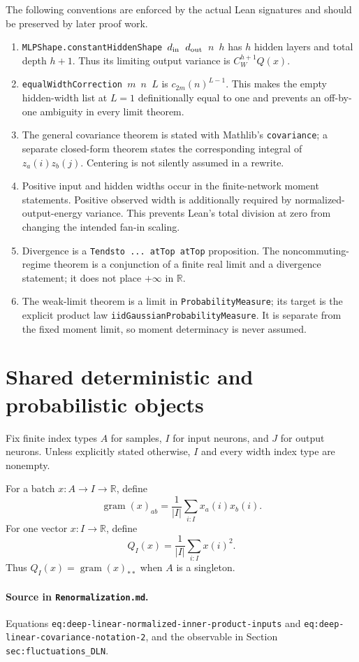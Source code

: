 The following conventions are enforced by the actual Lean signatures and should be preserved by
later proof work.
\begin{enumerate}
  \item \texttt{MLPShape.constantHiddenShape $d_{\rm in}$ $d_{\rm out}$ $n$ $h$} has $h$
    hidden layers and total depth $h+1$.  Thus its limiting output variance is
    $C_W^{h+1}Q(x)$.
  \item \texttt{equalWidthCorrection $m$ $n$ $L$} is
    $c_{2m}(n)^{L-1}$.  This makes the empty hidden-width list at $L=1$ definitionally equal to
    one and prevents an off-by-one ambiguity in every limit theorem.
  \item The general covariance theorem is stated with Mathlib's \texttt{covariance}; a separate
    closed-form theorem states the corresponding integral of $z_a(i)z_b(j)$.  Centering is not
    silently assumed in a rewrite.
  \item Positive input and hidden widths occur in the finite-network moment statements.  Positive
    observed width is additionally required by normalized-output-energy variance.  This prevents
    Lean's total division at zero from changing the intended fan-in scaling.
  \item Divergence is a \texttt{Tendsto ... atTop atTop} proposition.  The noncommuting-regime
    theorem is a conjunction of a finite real limit and a divergence statement; it does not place
    $+\infty$ in $\mathbb R$.
  \item The weak-limit theorem is a limit in \texttt{ProbabilityMeasure}; its target is the
    explicit product law \texttt{iidGaussianProbabilityMeasure}.  It is separate from the fixed
    moment limit, so moment determinacy is never assumed.
\end{enumerate}

\section{Shared deterministic and probabilistic objects}

Fix finite index types $A$ for samples, $I$ for input neurons, and $J$ for output neurons.  Unless
explicitly stated otherwise, $I$ and every width index type are nonempty.

\begin{definition}
\label{def:dln:normalizedGram}
For a batch $x:A\to I\to\mathbb R$, define
\[
 \operatorname{gram}(x)_{ab}
   =\frac1{|I|}\sum_{i:I}x_a(i)x_b(i).
\]
For one vector $x:I\to\mathbb R$, define
\[
 Q_I(x)=\frac1{|I|}\sum_{i:I}x(i)^2.
\]
Thus $Q_I(x)=\operatorname{gram}(x)_{**}$ when $A$ is a singleton.

\paragraph{Source in \texttt{Renormalization.md}.}
Equations \texttt{eq:deep-linear-normalized-inner-product-inputs} and
\texttt{eq:deep-linear-covariance-notation-2}, and the observable in Section
\texttt{sec:fluctuations\_DLN}.
\end{definition}


